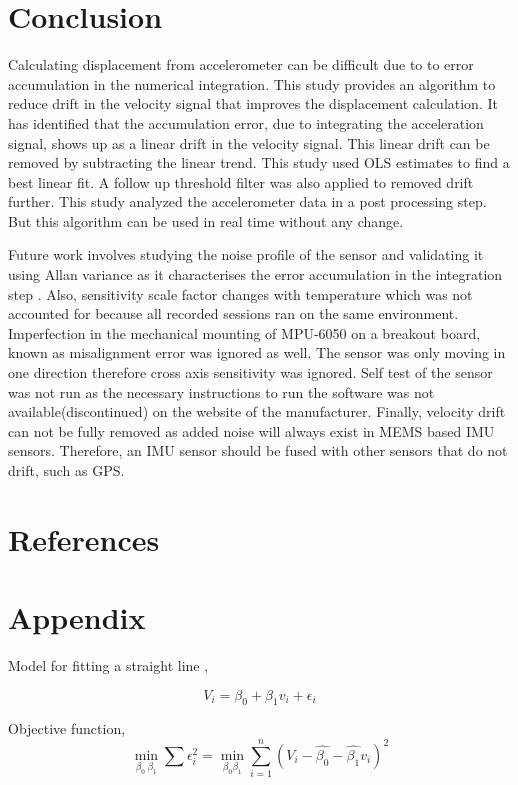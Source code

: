 \documentclass{article}
\begin{document}
\pagebreak

\section{Conclusion}
Calculating displacement from accelerometer can be difficult due to to error accumulation in the numerical integration. This study provides an algorithm to reduce drift in the velocity signal that improves the displacement calculation. It has identified that the accumulation error, due to integrating the acceleration signal, shows up as a linear drift in the velocity signal. This linear drift can be removed by subtracting the linear trend. This study used OLS estimates to find a best linear fit. A follow up threshold filter was also applied to removed drift further.  This study analyzed the accelerometer data in a post processing step. But this algorithm can be used in real time without any change.

Future work involves studying the noise profile of the sensor and validating it using Allan variance as it characterises the error accumulation in the integration step \cite{noauthor_allan_nodate}. Also, sensitivity scale factor changes with temperature which was not accounted for because all recorded sessions ran on the same environment. Imperfection in the mechanical mounting of MPU-6050 on a breakout board, known as misalignment error was ignored as well. The sensor was only moving in one direction therefore cross axis sensitivity was ignored. Self test of the sensor was not run as the necessary instructions to run the software was not available(discontinued) on the website of the manufacturer. Finally, velocity drift can not be fully removed as added noise will always exist in MEMS based IMU sensors. Therefore, an IMU sensor should be fused with other sensors that do not drift, such as GPS.

\section{References}
\printbibliography[heading=none]

\section{Appendix}
Model for fitting a straight line \cite{neter1996applied},

$$V_i = \beta_0 + \beta_1 v_i + \epsilon_i$$

Objective function,
$$\min_{\beta_0\ \beta_1} \sum \epsilon_i^2 = \min_{\beta_0\beta_1}  \sum_{i=1}^{n}(V_i - \hat{\beta_0} - \hat{\beta_1}v_i)^2$$
\end{document}
